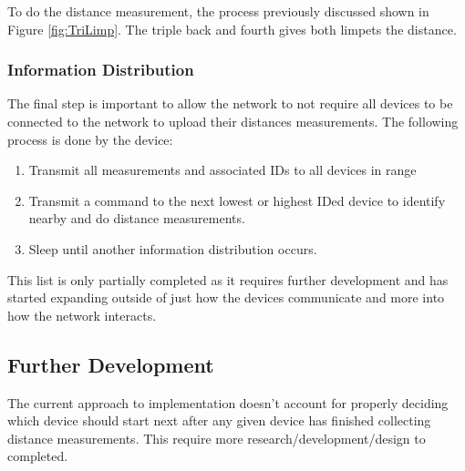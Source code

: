 \documentclass{article}
\begin{document}
To do the distance measurement, the process previously discussed shown in Figure \ref{fig:TriLimp}. The triple back and fourth gives both limpets the distance.

\subsubsection{Information Distribution}
The final step is important to allow the network to not require all devices to be connected to the network to upload their distances measurements. The following process is done by the device:

\begin{enumerate}
	\item Transmit all measurements and associated IDs to all devices in range
	\item Transmit a command to the next lowest or highest IDed device to identify nearby and do distance measurements.
	\item Sleep until another information distribution occurs.
\end{enumerate}

This list is only partially completed as it requires further development and has started expanding outside of just how the devices communicate and more into how the network interacts.

\subsection{Further Development}
The current approach to implementation doesn't account for properly deciding which device should start next after any given device has finished collecting distance measurements. This require more research/development/design to completed.
\end{document}
